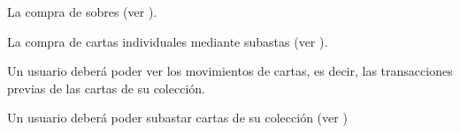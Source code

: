 \begin{RFColeccionCartas}
\begin{RFColeccionCartas}
\begin{RFColeccionCartas}
			\item La compra de sobres (ver ).
			\item La compra de cartas individuales mediante subastas (ver ).
		\end{RFColeccionCartas}
		\item Un usuario deberá poder ver los movimientos de cartas, es decir, las transacciones previas de las cartas de su colección.
		\item Un usuario deberá poder subastar cartas de su colección (ver )
	\end{RFColeccionCartas}
\end{RFColeccionCartas}